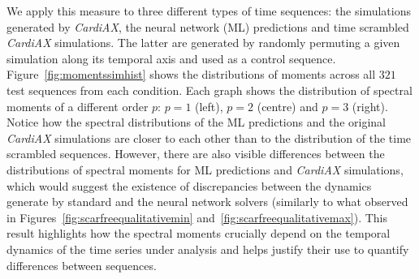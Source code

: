 \documentclass[utf8]{frontiers_suppmat} %
\begin{document}
We apply this measure to three different types of time sequences: the simulations generated by \textit{CardiAX}, the neural network (ML) predictions and time scrambled \textit{CardiAX} simulations. The latter are generated by randomly permuting a given simulation along its temporal axis and used as a control sequence.
Figure~\ref{fig:momentssimhist} shows the distributions of moments across all $321$ test sequences from each condition. Each graph shows the distribution of spectral moments of a different order $p$: $p=1$ (left), $p=2$ (centre) and $p=3$ (right). Notice how the spectral distributions of the ML predictions and the original \textit{CardiAX} simulations are closer to each other than to the distribution of the time scrambled sequences. However, there are also visible differences between the distributions of spectral moments for ML predictions and \textit{CardiAX} simulations, which would suggest the existence of discrepancies between the dynamics generate by standard and the neural network solvers (similarly to what observed in Figures~\ref{fig:scarfreequalitativemin} and~\ref{fig:scarfreequalitativemax}). This result highlights how the spectral moments crucially depend on the temporal dynamics of the time series under analysis and helps justify their use to quantify differences between sequences.
\end{document}
